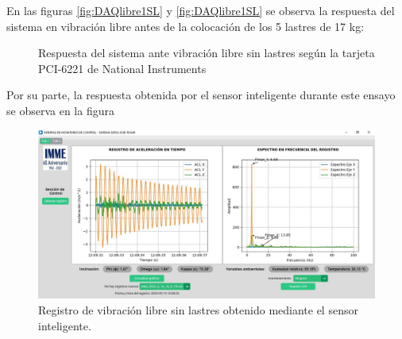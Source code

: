En las figuras \ref{fig:DAQlibre1SL} y \ref{fig:DAQlibre1SL} se observa la respuesta del sistema en vibración libre antes de la colocación de los 5 lastres de 17 kg:

\begin{figure}[H]
    \centering
    \hfill
    \caption{Respuesta del sistema ante vibración libre sin lastres según la tarjeta PCI-6221 de National Instruments}
    \label{fig:DAQlibreSL}
\end{figure}

Por su parte, la respuesta obtenida por el sensor inteligente durante este ensayo se observa en la figura 

\begin{figure}[H]
    \centering
    \includegraphics[width = \textwidth]{imagenes/cap3_resultados/Ensayos/VibLibreSinLastresSMARTSENSOR.jpg}
    \caption{Registro de vibración libre sin lastres obtenido mediante el sensor inteligente.}
    \label{fig:libreGUI_SL}
\end{figure}


